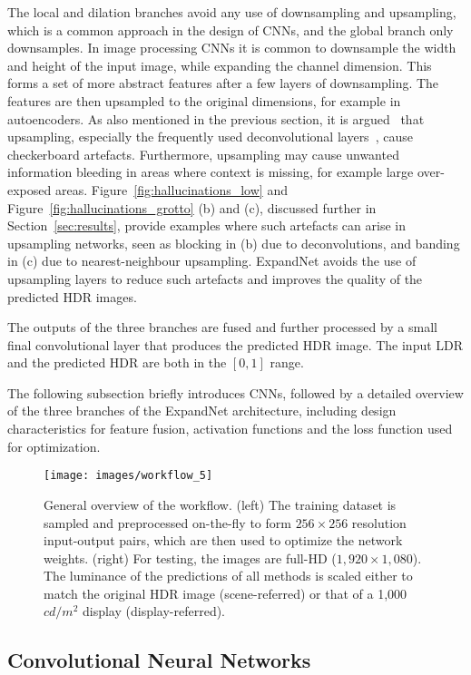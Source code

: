 \documentclass{egpubl}
\newcommand{\tc}[1]{{#1}}
\begin{document}
The local and dilation branches avoid any use of downsampling and upsampling, which is a common approach in the design of CNNs, and the global branch
only downsamples. In image processing CNNs it is common to downsample the width and height of the input image, while expanding the channel dimension.
This forms a set of more abstract features after a few layers of downsampling. The features are then upsampled to the original dimensions, for
example in autoencoders. \tc{As also mentioned in the previous section, it is} argued~\cite{odena2016deconvolution} that upsampling, especially the frequently used deconvolutional
layers~\cite{shi2016deconv}, cause checkerboard artefacts. Furthermore, upsampling may cause unwanted information bleeding in areas where context is
missing, for example large over-exposed areas. Figure~\ref{fig:hallucinations_low} and Figure~\ref{fig:hallucinations_grotto} (b) and (c), discussed further in Section~\ref{sec:results},
provide examples where such artefacts can arise in upsampling networks, seen as blocking in (b) due to deconvolutions, and banding in (c) due to
nearest-neighbour upsampling. ExpandNet avoids the use of upsampling layers to reduce such artefacts and improves the quality of the predicted HDR
images.

The outputs of the three branches are fused and further processed by a small
final convolutional layer that produces the predicted HDR image. The input LDR
and the predicted HDR are both in the $[0, 1]$ range.

The following subsection briefly introduces CNNs, followed by a detailed
overview of the three branches of the ExpandNet architecture, including design
characteristics for feature fusion, activation functions and the loss function
used for optimization.

\begin{figure*}[htb]
    \centering
    \texttt{[image: images/workflow\_5]}
    \caption{General overview of the workflow. (left) The training dataset is
    sampled and preprocessed on-the-fly to form $256\times256$ resolution
    input-output pairs, which are then used to optimize the network weights.
    (right) For testing, the images are full-HD ($1,920 \times 1,080$). The
    luminance of the predictions of all methods is scaled either to match the
    original HDR image (scene-referred) or that of a 1,000 $cd/m^2$ display
    (display-referred).}\label{fig:workflow}
\end{figure*}

\subsection{\textbf{Convolutional Neural Networks}}
\end{document}
